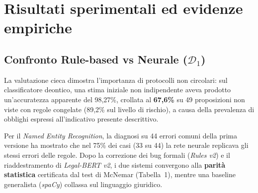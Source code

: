 \documentclass[12pt,a4paper,oneside]{article}
\begin{document}
\section{Risultati sperimentali ed evidenze empiriche}

\subsection{Confronto Rule-based vs Neurale (\texorpdfstring{$\mathcal{D}_1$}{D1})}
La valutazione cieca dimostra l'importanza di protocolli non circolari: sul classificatore deontico, una stima iniziale non indipendente aveva prodotto un'accuratezza apparente del 98,27\%, crollata al \textbf{67,6\%} su 49 proposizioni non viste con regole congelate (89,2\% sul livello di rischio), a causa della prevalenza di obblighi espressi all'indicativo presente descrittivo.

Per il \emph{Named Entity Recognition}, la diagnosi su 44 errori comuni della prima versione ha mostrato che nel 75\% dei casi (33 su 44) la rete neurale replicava gli stessi errori delle regole. Dopo la correzione dei bug formali (\emph{Rules v2}) e il riaddestramento di \emph{Legal-BERT v2}, i due sistemi convergono alla \textbf{parità statistica} certificata dal test di McNemar (Tabella~1), mentre una baseline generalista (\emph{spaCy}) collassa sul linguaggio giuridico.

\begin{table}[htbp]
  \centering
  \small
  \caption{Confronto sintetico delle prestazioni strict dei sistemi NER (IT).}
\end{table}
\end{document}
